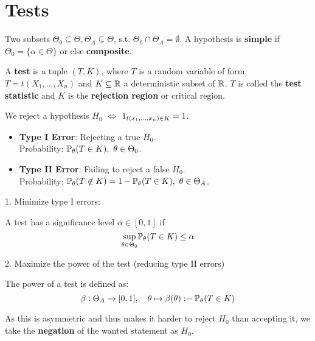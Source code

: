 \section{Tests}
\begin{definition*}
  Two subsets \(\Theta_0 \subseteq \Theta, \Theta_A \subseteq \Theta\), s.t. \(\Theta_0 \cap \Theta_A = \emptyset\). A hypothesis is \textbf{simple} if \(\Theta_0 = \{\alpha \in \Theta\}\) or else \textbf{composite}.
\end{definition*}

\begin{definition*}[Test]
  A \textbf{test} is a tuple \((T, K)\), where \(T\) is a random variable of form \(T = t(X_1, \ldots, X_n)\) and \(K \subseteq \R\) a deterministic subset of \(\R\). \(T\) is called the \textbf{test statistic} and \(K\) is the \textbf{rejection region} or critical region. 
\end{definition*}

We reject a hypothesis \(H_0\) \(\iff\) \(\I_{t(x_1, \ldots, x_n) \in K} = 1\).

\begin{definition*}
  \begin{itemize}
    \item \textbf{Type I Error}: Rejecting a true \(H_0\). \\
    Probability: \(\P_\theta(T \in K), \ \theta \in \Theta_0\).
    \item \textbf{Type II Error}: Failing to reject a false \(H_0\). \\
    Probability: \(\P_\theta(T \not\in K) = 1 - \P_\theta(T \in K), \ \theta \in \Theta_A\).
  \end{itemize}
\end{definition*}
1. Minimize type I errors:
\begin{definition*}
  A test has a significance level \(\alpha \in [0, 1]\) if
  \[\underset{\theta \in \Theta_0}{\sup} \P_\theta(T \in K) \leq \alpha\]
\end{definition*}

2. Maximize the power of the test (reducing type II errors)
\begin{definition*}
  The power of a test is defined as:
  \[\beta: \Theta_A \to [0, 1], \quad \theta \mapsto \beta(\theta) := \P_\theta(T \in K)\]
\end{definition*}

As this is asymmetric and thus makes it harder to reject \(H_0\) than accepting it, we take the \textbf{negation} of the wanted statement as \(H_0\).

